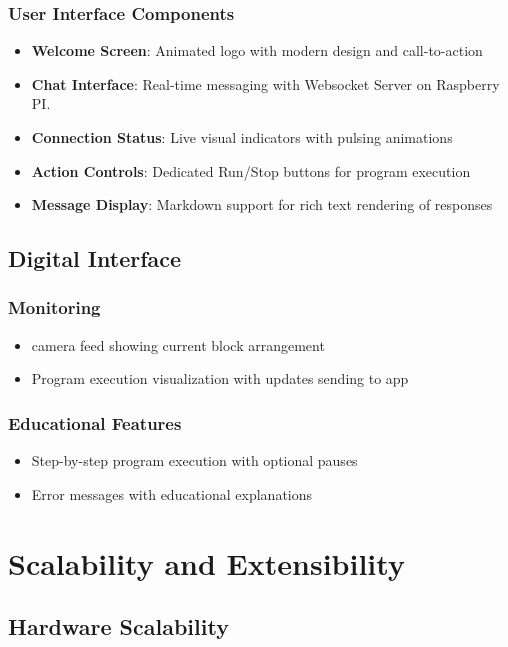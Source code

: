 \subsubsection{User Interface Components}
\begin{itemize}
    \item \textbf{Welcome Screen}: Animated logo with modern design and call-to-action
    \item \textbf{Chat Interface}: Real-time messaging with Websocket Server on Raspberry PI.
    \item \textbf{Connection Status}: Live visual indicators with pulsing animations
    \item \textbf{Action Controls}: Dedicated Run/Stop buttons for program execution
    \item \textbf{Message Display}: Markdown support for rich text rendering of responses
\end{itemize}

\subsection{Digital Interface}

\subsubsection{Monitoring}
\begin{itemize}
    \item camera feed showing current block arrangement
    \item Program execution visualization with updates sending to app
\end{itemize}

\subsubsection{Educational Features}
\begin{itemize}
    \item Step-by-step program execution with optional pauses
    \item Error messages with educational explanations
\end{itemize}

\section{Scalability and Extensibility}

\subsection{Hardware Scalability}

